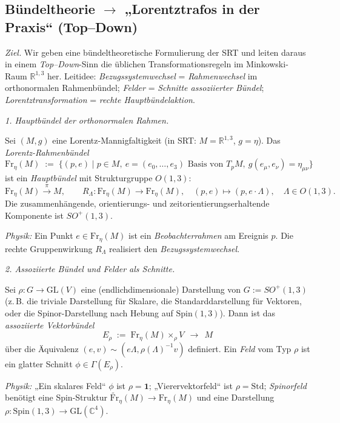 \documentclass[10pt, letterpaper]{article}
\newcommand{\R}{\mathbb{R}}
\newcommand{\GL}{\mathrm{GL}}
\newcommand{\Spin}{\mathrm{Spin}}
\begin{document}
\subsection{Bündeltheorie $\to$ „Lorentztrafos in der Praxis“ (Top–Down)}

\emph{Ziel.} Wir geben eine bündeltheoretische Formulierung der SRT und leiten daraus
in einem \emph{Top–Down}-Sinn die üblichen Transformationsregeln im Minkowski-Raum
$\R^{1,3}$ her. Leitidee: \emph{Bezugssystemwechsel} = \emph{Rahmenwechsel} im
orthonormalen Rahmenbündel; \emph{Felder} = \emph{Schnitte assoziierter Bündel};
\emph{Lorentztransformation} = \emph{rechte Hauptbündelaktion}.

\bigskip
\emph{1. Hauptbündel der orthonormalen Rahmen.}

Sei $(M,g)$ eine Lorentz-Mannigfaltigkeit (in SRT: $M=\R^{1,3}$, $g=\eta$).
Das \emph{Lorentz-Rahmenbündel}
\[
\mathrm{Fr}_\eta(M)\;:=\;\bigl\{(p,e)\mid p\in M,\ e=(e_0,\dots,e_3)\text{ Basis von }T_pM,\ g(e_\mu,e_\nu)=\eta_{\mu\nu}\bigr\}
\]
ist ein \emph{Hauptbündel} mit Strukturgruppe $O(1,3)$:
\[
\mathrm{Fr}_\eta(M)\xrightarrow{\ \pi\ }M,\qquad
R_\Lambda:\mathrm{Fr}_\eta(M)\to\mathrm{Fr}_\eta(M),\quad (p,e)\mapsto (p,e\cdot\Lambda),\quad \Lambda\in O(1,3).
\]
Die zusammenhängende, orientierungs- und zeitorientierungserhaltende Komponente ist $SO^+(1,3)$.

\smallskip
\emph{Physik:} Ein Punkt $e\in\mathrm{Fr}_\eta(M)$ ist ein \emph{Beobachterrahmen} am Ereignis $p$.
Die rechte Gruppenwirkung $R_\Lambda$ realisiert den \emph{Bezugssystemwechsel}.

\bigskip
\emph{2. Assoziierte Bündel und Felder als Schnitte.}

Sei $\rho:G\to\GL(V)$ eine (endlichdimensionale) Darstellung von $G:=SO^+(1,3)$
(z.\,B. die triviale Darstellung für Skalare, die Standarddarstellung für Vektoren,
oder die Spinor-Darstellung nach Hebung auf $\Spin(1,3)$).
Dann ist das \emph{assoziierte Vektorbündel}
\[
E_\rho \;:=\; \mathrm{Fr}_\eta(M)\times_\rho V\ \ \longrightarrow\ \ M
\]
über die Äquivalenz $(e,v)\sim (e\Lambda,\rho(\Lambda)^{-1}v)$ definiert.
Ein \emph{Feld} vom Typ $\rho$ ist ein glatter Schnitt $\phi\in\Gamma(E_\rho)$.

\smallskip
\emph{Physik:} „Ein skalares Feld“ $\phi$ ist $\rho=\mathbf{1}$; „Vierervektorfeld“ ist
$\rho=\text{Std}$; \emph{Spinorfeld} benötigt eine Spin-Struktur
$\widetilde{\mathrm{Fr}}_\eta(M)\to\mathrm{Fr}_\eta(M)$ und eine Darstellung $\rho:\Spin(1,3)\to\GL(\mathbb{C}^4)$.
\end{document}
